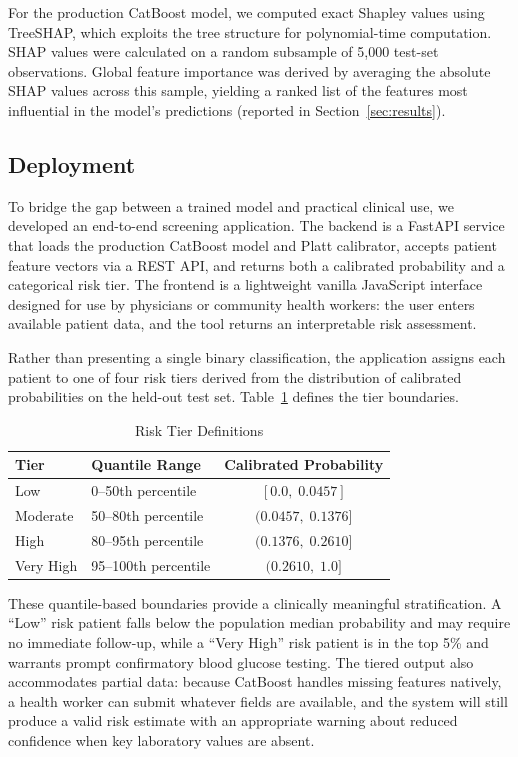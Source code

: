 For the production CatBoost model, we computed exact Shapley values using TreeSHAP, which exploits the tree structure for polynomial-time computation. SHAP values were calculated on a random subsample of 5,000 test-set observations. Global feature importance was derived by averaging the absolute SHAP values across this sample, yielding a ranked list of the features most influential in the model's predictions (reported in Section~\ref{sec:results}).

\subsection{Deployment}
\label{subsec:deployment}

To bridge the gap between a trained model and practical clinical use, we developed an end-to-end screening application. The backend is a FastAPI service that loads the production CatBoost model and Platt calibrator, accepts patient feature vectors via a REST API, and returns both a calibrated probability and a categorical risk tier. The frontend is a lightweight vanilla JavaScript interface designed for use by physicians or community health workers: the user enters available patient data, and the tool returns an interpretable risk assessment.

Rather than presenting a single binary classification, the application assigns each patient to one of four risk tiers derived from the distribution of calibrated probabilities on the held-out test set. Table~\ref{tab:risk-tiers} defines the tier boundaries.

\begin{table}[ht]
\centering
\caption{Risk Tier Definitions}
\label{tab:risk-tiers}
\begin{tabular}{llc}
\hline
\textbf{Tier} & \textbf{Quantile Range} & \textbf{Calibrated Probability} \\
\hline
Low       & 0--50th percentile   & $[0.0,\; 0.0457]$ \\
Moderate  & 50--80th percentile  & $(0.0457,\; 0.1376]$ \\
High      & 80--95th percentile  & $(0.1376,\; 0.2610]$ \\
Very High & 95--100th percentile & $(0.2610,\; 1.0]$ \\
\hline
\end{tabular}
\end{table}

These quantile-based boundaries provide a clinically meaningful stratification. A ``Low'' risk patient falls below the population median probability and may require no immediate follow-up, while a ``Very High'' risk patient is in the top 5\% and warrants prompt confirmatory blood glucose testing. The tiered output also accommodates partial data: because CatBoost handles missing features natively, a health worker can submit whatever fields are available, and the system will still produce a valid risk estimate with an appropriate warning about reduced confidence when key laboratory values are absent.
